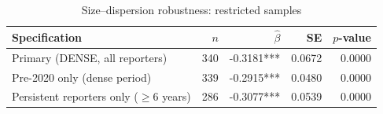 \begin{table}[htbp]
\centering
\caption{Size--dispersion robustness: restricted samples}
\label{tab:dispersion_robustness}
\begin{tabular}{lrrrr}
\toprule
\textbf{Specification} & \textbf{$n$} & $\hat{\beta}$ & \textbf{SE} & \textbf{$p$-value} \\
\midrule
Primary (DENSE, all reporters) & 340 & -0.3181*** & 0.0672 & 0.0000 \\
Pre-2020 only (dense period) & 339 & -0.2915*** & 0.0480 & 0.0000 \\
Persistent reporters only ($\geq 6$ years) & 286 & -0.3077*** & 0.0539 & 0.0000 \\
\bottomrule
\end{tabular}
\end{table}
